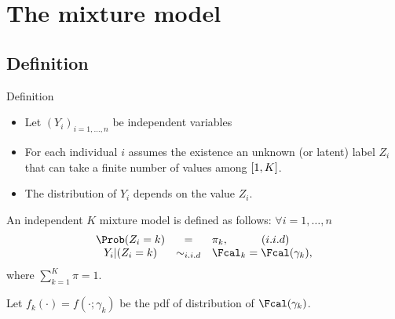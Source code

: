 \documentclass[compress,10pt]{beamer}
\begin{document}
 
 


 


\section{The mixture model}

\subsection{Definition}
\begin{frame}{Definition}
\begin{itemize}
 \item Let $(Y_i)_{i=1,\dots, n}$ be independent variables 
\item For each individual $i$ assumes the existence an unknown (or latent) label $Z_i$ that can take a finite number of values among $\interval{1}{K}$. 
\item The distribution of  $Y_i$ depends on the value  $Z_i$. 
 \end{itemize}


\begin{definition} \label{Def:MixtureModel}
  An independent $K$ mixture model is defined as follows: $\forall i =1,\dots,n$
  \begin{equation} \label{Eq:MixtureModel}
  \begin{array}{ccl}
  \Prob(Z_i = k) & = &  \pi_k,  \quad \quad \quad (i.i.d)\\
  Y_i | (Z_i = k) & \sim_{i.i.d}& \Fcal_k = \Fcal(\gamma_k),
  \end{array}
  \end{equation}
  where $\sum_{k=1}^K\pi =1$. 
\end{definition}


Let  $f_k(\cdot) = f(\cdot; \gamma_k)$ be the pdf of distribution of  $\Fcal(\gamma_k)$.

\end{frame}
\end{document}
